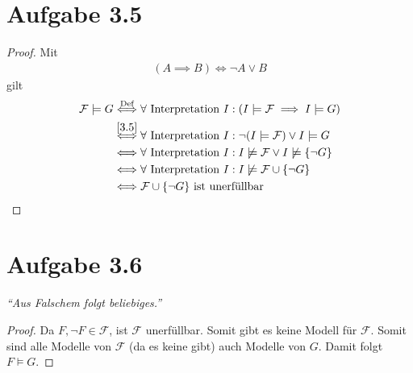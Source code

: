\documentclass[12pt,a4paper]{article}
\newcommand{\F}{\mathcal{F}}
\begin{document}
\section*{Aufgabe 3.5}
\begin{proof}
Mit
\begin{align}\label{3.5}
(A\implies B)\Longleftrightarrow \neg A\vee B
\end{align}
gilt
\begin{align*}
\F\models G 
&\stackrel{\text{Def}}{\Longleftrightarrow}
\forall\text{ Interpretation }I:(I\models \F\implies I\models G)\\
&\stackrel{\eqref{3.5}}{\Longleftrightarrow}
\forall\text{ Interpretation }I:
\neg(I\models \F)\vee I\models G\\
&\stackrel{\text{}}{\Longleftrightarrow}
\forall\text{ Interpretation }I:
I\not\models \F\vee I\not\models \lbrace\neg G\rbrace\\
&\stackrel{\text{}}{\Longleftrightarrow}
\forall\text{ Interpretation }I:
I\not\models \F\cup\lbrace\neg G\rbrace\\
&\stackrel{\text{}}{\Longleftrightarrow}
\F\cup\lbrace\neg G\rbrace\text{ ist unerfüllbar}
\end{align*}
\end{proof}

\section*{Aufgabe 3.6}
\textit{``Aus Falschem folgt beliebiges.''}\\
\begin{proof}
Da $F,\neg F\in\F$, ist $\F$ unerfüllbar. Somit gibt es keine Modell für $\F$. Somit sind alle Modelle von $\F$ (da es keine gibt) auch Modelle von $G$. Damit folgt $F\models G$.
\end{proof}
\end{document}
